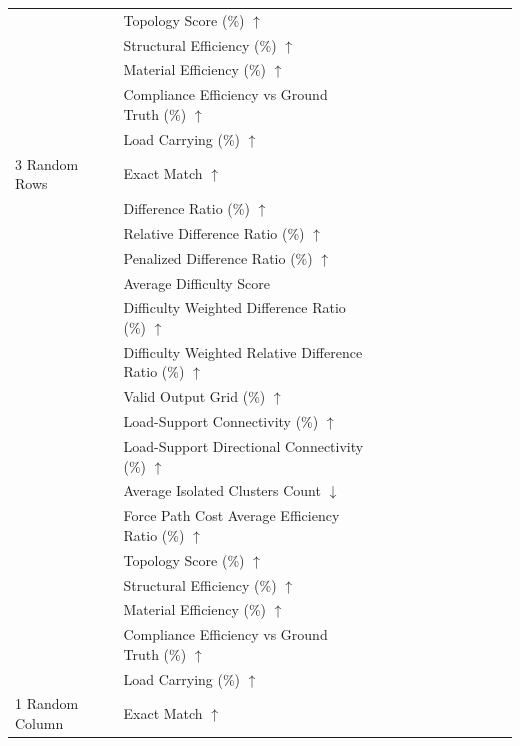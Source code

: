 \begin{table}[!h]
{\begin{tabular}{llllllllllll}
 & Topology Score (\%) $\uparrow$ &  &  &  &  &  &  &  &  &  &  \\
 & Structural Efficiency (\%) $\uparrow$ &  &  &  &  &  &  &  &  &  &  \\
 & Material Efficiency (\%) $\uparrow$ &  &  &  &  &  &  &  &  &  &  \\
 & Compliance Efficiency vs Ground Truth (\%) $\uparrow$ &  &  &  &  &  &  &  &  &  &  \\
 & Load Carrying (\%) $\uparrow$ &  &  &  &  &  &  &  &  &  &  \\
3 Random Rows & Exact Match $\uparrow$ &  &  &  &  &  &  &  &  &  &  \\
 & Difference Ratio (\%) $\uparrow$ &  &  &  &  &  &  &  &  &  &  \\
 & Relative Difference Ratio (\%) $\uparrow$ &  &  &  &  &  &  &  &  &  &  \\
 & Penalized Difference Ratio (\%) $\uparrow$ &  &  &  &  &  &  &  &  &  &  \\
 & Average Difficulty Score &  &  &  &  &  &  &  &  &  &  \\
 & Difficulty Weighted Difference Ratio (\%) $\uparrow$ &  &  &  &  &  &  &  &  &  &  \\
 & Difficulty Weighted Relative Difference Ratio (\%) $\uparrow$ &  &  &  &  &  &  &  &  &  &  \\
 & Valid Output Grid (\%) $\uparrow$ &  &  &  &  &  &  &  &  &  &  \\
 & Load-Support Connectivity (\%) $\uparrow$ &  &  &  &  &  &  &  &  &  &  \\
 & Load-Support Directional Connectivity (\%) $\uparrow$ &  &  &  &  &  &  &  &  &  &  \\
 & Average Isolated Clusters Count $\downarrow$ &  &  &  &  &  &  &  &  &  &  \\
 & Force Path Cost Average Efficiency Ratio (\%) $\uparrow$ &  &  &  &  &  &  &  &  &  &  \\
 & Topology Score (\%) $\uparrow$ &  &  &  &  &  &  &  &  &  &  \\
 & Structural Efficiency (\%) $\uparrow$ &  &  &  &  &  &  &  &  &  &  \\
 & Material Efficiency (\%) $\uparrow$ &  &  &  &  &  &  &  &  &  &  \\
 & Compliance Efficiency vs Ground Truth (\%) $\uparrow$ &  &  &  &  &  &  &  &  &  &  \\
 & Load Carrying (\%) $\uparrow$ &  &  &  &  &  &  &  &  &  &  \\
1 Random Column & Exact Match $\uparrow$ &  &  &  &  &  &  &  &  &  &  \\

\end{tabular}}
\end{table}
